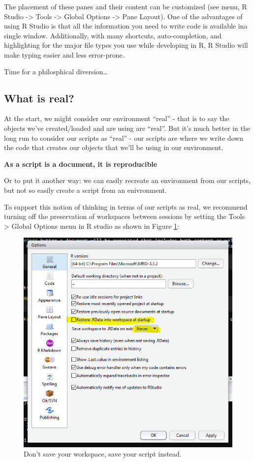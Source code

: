 \documentclass[12pt,]{book}
\begin{document}
The placement of these panes and their content can be customized (see menu,
R Studio -\textgreater{} Tools -\textgreater{} Global Options -\textgreater{} Pane Layout). One of the advantages of
using R Studio is that all the information you need to write code is available
ina single window. Additionally, with many shortcuts, auto-completion, and
highlighting for the major file types you use while developing in R, R Studio
will make typing easier and less error-prone.

Time for a philosphical diversion\ldots{}

\hypertarget{what-is-real}{%
\subsection{What is real?}\label{what-is-real}}

At the start, we might consider our environment ``real'' - that is to say the objects
we've created/loaded and are using are ``real''. But it's much better in the long run
to consider our scripts as ``real'' - our scripts are where we write down the code
that creates our objects that we'll be using in our environment.

\textbf{As a script is a document, it is reproducible}

Or to put it another way: we can easily recreate an environment from our scripts,
but not so easily create a script from an enivronment.

To support this notion of thinking in terms of our scripts as real, we recommend
turning off the preservation of workspaces between sessions by setting the
Tools \textgreater{} Global Options menu in R studio as shown in Figure \ref{fig:workspace}:



\begin{figure}

{\centering \includegraphics[width=0.8\linewidth]{img/rdata_turn_off} 

}

\caption{Don't save your workspace, save your script instead.}\label{fig:workspace}
\end{figure}
\end{document}
